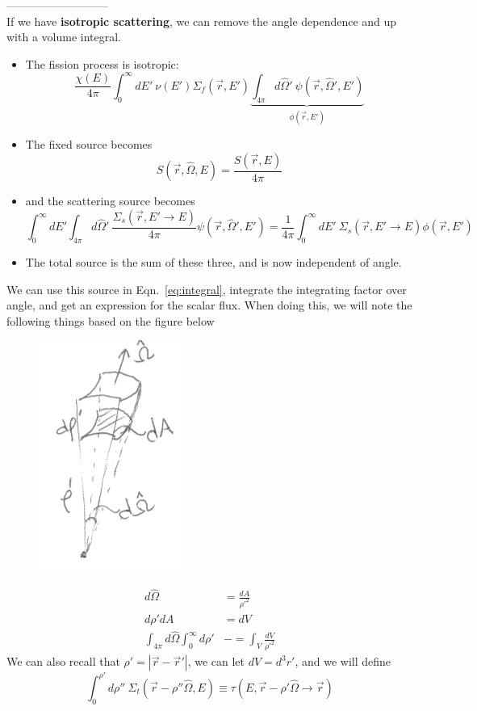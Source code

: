 \documentclass[12pt]{article}
\newcommand{\rvec}{\ensuremath{\vec{r}}}
\newcommand{\vOmega}{\ensuremath{\hat{\Omega}}}
\begin{document}
---------------------------\\
If we have \textbf{isotropic scattering}, we can remove the angle dependence and up with a volume integral.
%
\begin{itemize}
\item The fission process is isotropic:
\[\frac{\chi(E)}{4\pi} \int_0^{\infty} dE' \: \nu(E') \Sigma_f(\rvec, E') \underbrace{\int_{4\pi} d\vOmega' \: \psi(\rvec, \vOmega', E')}_{\phi(\rvec,E')}\]
\item The fixed source becomes
\[S(\rvec, \vOmega, E) = \frac{S(\rvec, E)}{4 \pi}\]
\item and the scattering source becomes
\[\int_0^{\infty} dE' \int_{4\pi} d\vOmega' \: \frac{\Sigma_s(\rvec,E' \rightarrow E)}{4\pi} \psi(\rvec, \vOmega', E') = \frac{1}{4\pi}\int_0^{\infty} dE'\:\Sigma_s(\rvec,E' \rightarrow E) \phi(\rvec,E')\]
\item The total source is the sum of these three, and is now independent of angle.
\end{itemize}
%
We can use this source in Eqn.~\ref{eq:integral}, integrate the integrating factor over angle, and get an expression for the scalar flux. When doing this, we will note the following things based on the figure below
%
\begin{figure}[h]
\begin{center}
  \includegraphics[width=1.25 in]{../figs/diff-area}
\end{center}
\end{figure}
\begin{align*}
d\vOmega &= \frac{dA}{\rho'^2}\\
d\rho' dA &= dV \\
\int_{4\pi} d\vOmega \int_0^{\infty} d\rho' &-= \int_{V} \frac{dV}{\rho'^2}
\end{align*}
%
We can also recall that $\rho' = |\vec{r} - \vec{r}'|$, we can let $dV = d^3r'$, and we will define
\[\int_0^{\rho'} d\rho'' \: \Sigma_t(\rvec-\rho''\vOmega,E) \equiv \tau(E,\vec{r} - \rho' \vOmega \rightarrow \vec{r})
\]
\end{document}
